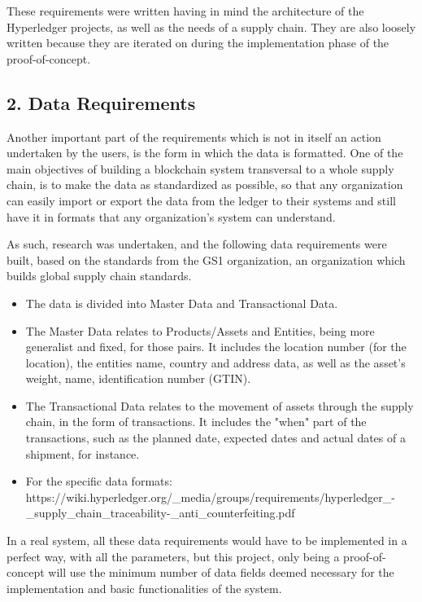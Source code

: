 These requirements were written having in mind the architecture of the Hyperledger projects, as well as the needs of a supply chain. They are also loosely written because they are iterated on during the implementation phase of the proof-of-concept.


\subsection*{2. Data Requirements}

Another important part of the requirements which is not in itself an action undertaken by the users, is the form in which the data is formatted. One of the main objectives of building a blockchain system transversal to a whole supply chain, is to make the data as standardized as possible, so that any organization can easily import or export the data from the ledger to their systems and still have it in formats that any organization's system can understand. 

As such, research was undertaken, and the following data requirements were built, based on the standards from the GS1 organization, an organization which builds global supply chain standards.

\begin{itemize}
	\item The data is divided into Master Data and Transactional Data.
	\item The Master Data relates to Products/Assets and Entities, being more generalist and fixed, for those pairs. It includes the location number (for the location), the entities name, country and address data, as well as the asset's weight, name, identification number (GTIN).
	\item The Transactional Data relates to the movement of assets through the supply chain, in the form of transactions. It includes the "when" part of the transactions, such as the planned date, expected dates and actual dates of a shipment, for instance.
	\item \par For the specific data formats: https://wiki.hyperledger.org/\_media/groups/requirements/hyperledger\_-\_supply\_chain\_traceability-\_anti\_counterfeiting.pdf
\end{itemize}

In a real system, all these data requirements would have to be implemented in a perfect way, with all the parameters, but this project, only being a proof-of-concept will use the minimum number of data fields deemed necessary for the implementation and basic functionalities of the system.
		
